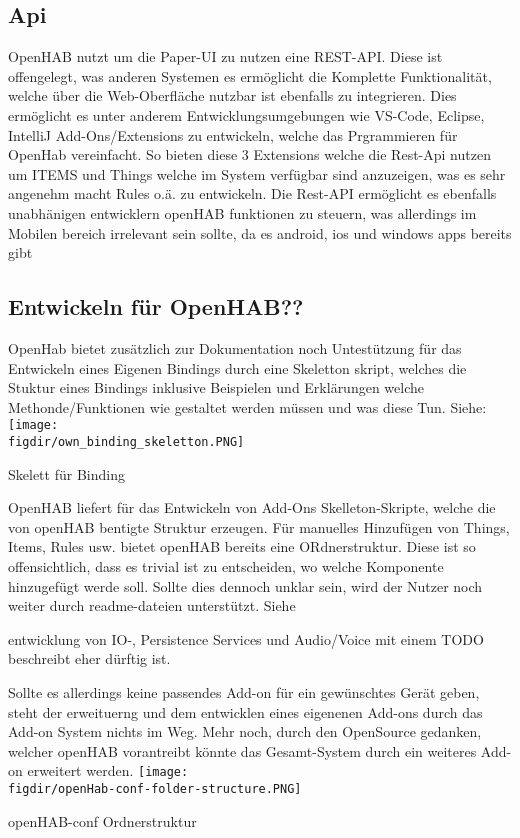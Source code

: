 \subsection{Api}
OpenHAB nutzt um die Paper-UI zu nutzen eine REST-API. Diese ist offengelegt, was anderen Systemen es ermöglicht die Komplette Funktionalität, welche über die Web-Oberfläche nutzbar ist ebenfalls zu integrieren. Dies ermöglicht es unter anderem Entwicklungsumgebungen wie VS-Code, Eclipse, IntelliJ Add-Ons/Extensions zu entwickeln, welche das Prgrammieren für OpenHab vereinfacht. So bieten diese 3 Extensions welche die Rest-Api nutzen um ITEMS und Things welche im System verfügbar sind anzuzeigen, was es sehr angenehm macht Rules o.ä. zu entwickeln.
Die Rest-API ermöglicht es ebenfalls unabhänigen entwicklern openHAB funktionen zu steuern, was allerdings im Mobilen bereich irrelevant sein sollte, da es android, ios und windows apps bereits gibt


\subsection{Entwickeln für OpenHAB??} \label{sec:custom-development}


OpenHab bietet zusätzlich zur Dokumentation noch Untestützung für das Entwickeln eines Eigenen Bindings durch eine Skeletton skript, welches die Stuktur eines Bindings inklusive Beispielen und Erklärungen welche Methonde/Funktionen wie gestaltet werden müssen und was diese Tun. Siehe:
\captionsetup{type=figure}
\texttt{[image: \\figdir/own\_binding\_skeletton.PNG]}
\caption{Skelett für Binding \label{fig:own_binding_skeletton}}

OpenHAB liefert für das Entwickeln von Add-Ons Skelleton-Skripte, welche die von openHAB bentigte Struktur erzeugen. Für manuelles Hinzufügen von Things, Items, Rules usw. bietet openHAB bereits eine ORdnerstruktur. Diese ist so offensichtlich, dass es trivial ist zu entscheiden, wo welche Komponente hinzugefügt werde soll. Sollte dies dennoch unklar sein, wird der Nutzer noch weiter durch readme-dateien unterstützt. Siehe 

entwicklung von IO-, Persistence Services und Audio/Voice mit einem TODO beschreibt eher dürftig ist.


Sollte es allerdings keine passendes Add-on für ein gewünschtes Gerät geben, steht der erweituerng und dem entwicklen eines eigenenen Add-ons durch das Add-on System nichts im Weg. Mehr noch, durch den OpenSource gedanken, welcher openHAB vorantreibt könnte das Gesamt-System durch ein weiteres Add-on erweitert werden.
\captionsetup{type=figure}
\texttt{[image: \\figdir/openHab-conf-folder-structure.PNG]}
\caption{openHAB-conf Ordnerstruktur \label{fig:openHab-conf-folder-structure}}



